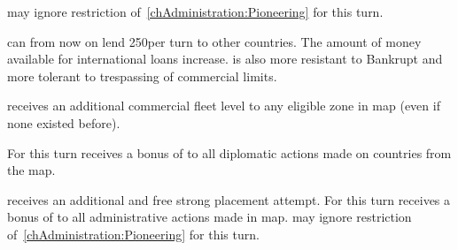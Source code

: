 


\phadm
\aparag \ENG may ignore restriction of~\ref{chAdministration:Pioneering} for
this turn.

\effetlong
\aparag \ENG can from now on lend 250\ducats per turn to other countries.
\aparag The amount of money available for international loans increase.
\aparag \ENG is also more resistant to Bankrupt and more tolerant to
trespassing of commercial limits.










\phevnt
\aparag \HOL receives an additional commercial fleet level to any eligible
\STZ zone in \ROTW map (even if none existed before).

\phdipl
\aparag For this turn \HOL receives a bonus of  to all diplomatic
actions made on countries from the \ROTW map.

\phadm
\aparag \HOL receives an additional and free strong \TP placement attempt.
\aparag For this turn \HOL receives a bonus of  to all
administrative actions made in \ROTW map.
\aparag \HOL may ignore restriction of~\ref{chAdministration:Pioneering} for
this turn.



